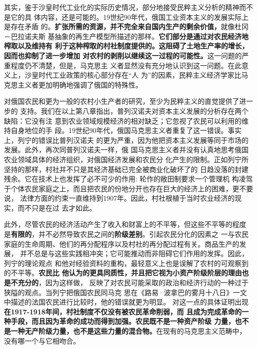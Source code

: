 其实，鉴于沙皇时代工业化的实际历史情况，部分地接受民粹主义分析的精神而不是它的具
体内容，还是可能的。19世纪90年代，俄国工业资本主义的发展实际上是存在矛盾
的。\textbf{扩张所需的资源，并不完全来自国内生产的剩余价值，}就像杜冈－巴拉诺夫斯
基抽象的再生产模型所描述的那样。\textbf{它们部分是通过对农民经济地榨取以及维持有
  利于这种榨取的村社制度提供的。这阻碍了土地生产率的增长，因而也抑制了进一步增加
  对农村的剥削以继续这一过程的可能性。}这一问题的严重程度仍不清楚，但是，马克思主
义者显然没有充分地认识到这一问题。在此意义上，沙皇时代工业政策的核心部分存在“人
为”的因素，民粹主义经济学家比马克思主义者更加明确地强调了俄国的特殊性。

对俄国农民和更为一般的农村小生产者的研究，至少为民粹主义的直觉提供了进一步的
支持。我们在以上第八章指出，普列汉诺夫对资本主义发展的分析存在两个缺陷：它没有注
意到农业领域规模经济的相对缺乏；它忽视了农民可以利用的维持自身地位的手
段。19世纪90年代，俄国马克思主义者重复了这一错误。事实上，列宁的错误比普列汉诺夫
的更为严重，因为他把资本主义发展等同于市场的发展。此外，再次同普列汉诺夫一样，俄
国马克思主义者并没有认真地思考俄国农业领域具体的经济组织，对俄国经济发展和农民分
化产生的限制。正如列宁所坚持的那样，村社并不只是其经济基础已完全被商业化破坏了的
日趋没落的封建残余。它在技术上也发挥了必不可少的作用: 轮作的敞田制要求一个管理机
构凌驾于个体农民家庭之上，而且把农民的份地分开也存在巨大的经济上的困难，更不要说，
法律方面的约束一直维持到1907年。因此，村社根植于当时农业经济的现实，而不只是在过
去才如此。

此外，尽管农民的经济活动产生了收入和财富上的不平等，但这些不平等的程度
是\textbf{有限的}，并不必然导致农民之间的\textbf{阶级差别}。引起农民分化的因素之
一与农民家庭的生命周期、他们的再分配程序以及村社的再分配过程有关。商品生产的发展，
并不总是与这些实践相冲突；它可能推动而非阻碍它们作用的发挥。因此，列宁的理论观点
和他对经验资料的重构，最轻意义上也是误解了农村的可观察到的不平等。\textbf{农民比
  他认为的更具同质性，并且把它视为小资产阶级阶层的理由也是不充分的}，因为这样做，
反映了对农民可能采取的政治和经济行动的一种过于狭隘的观点。当列宁把俄国农民同马克
思在《路易·波拿巴的雾月十八日》一文中描述的法国农民进行比较时，他的错误就更为明显。
对这一点的具体证明出现\textbf{在1917-1918年间，村社制度不仅没有被农民革命削弱，而
  且成为完成革命的一种手段，而且因为革命的成功而得到加强。农民既不是一种资产阶级
  力量，也不是一种无产阶级力量，也不是这些力量的混合物。}在现有的马克思主义范畴中，
没有哪一个与它相吻合。

